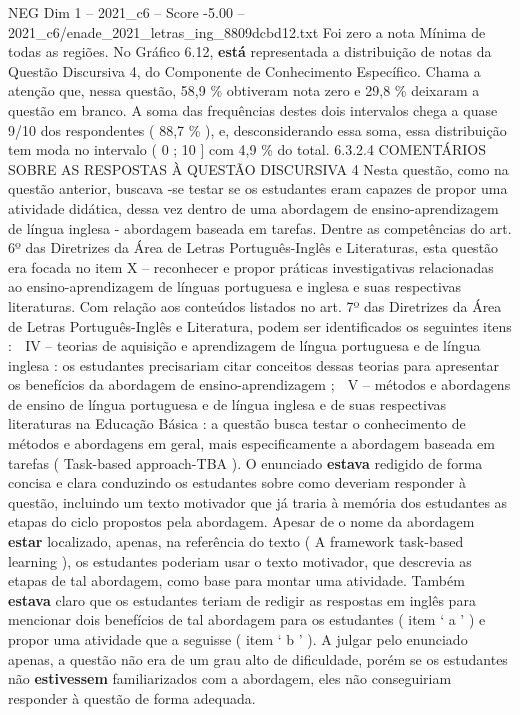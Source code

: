 \begin{textsample}{NEG Dim 1 – 2021\_c6 – Score -5.00 – 2021\_c6/enade\_2021\_letras\_ing\_8809dcbd12.txt}
Foi zero a nota Mínima de todas as regiões.
No Gráfico 6.12, \textbf{está} representada a distribuição de notas da Questão Discursiva 4, do Componente de Conhecimento Específico.
Chama a atenção que, nessa questão, 58,9 \% obtiveram nota zero e 29,8 \% deixaram a questão em branco.
A soma das frequências destes dois intervalos chega a quase 9/10 dos respondentes ( 88,7 \% ), e, desconsiderando essa soma, essa distribuição tem moda no intervalo ( 0 ; 10 ] com 4,9 \% do total. 6.3.2.4 COMENTÁRIOS SOBRE AS RESPOSTAS À QUESTÃO DISCURSIVA 4 Nesta questão, como na questão anterior, buscava -se testar se os estudantes eram capazes de propor uma atividade didática, dessa vez dentro de uma abordagem de ensino-aprendizagem de língua inglesa - abordagem baseada em tarefas.
Dentre as competências do art. 6º das Diretrizes da Área de Letras Português-Inglês e Literaturas, esta questão era focada no item X – reconhecer e propor práticas investigativas relacionadas ao ensino-aprendizagem de línguas portuguesa e inglesa e suas respectivas literaturas.
Com relação aos conteúdos listados no art. 7º das Diretrizes da Área de Letras Português-Inglês e Literatura, podem ser identificados os seguintes itens :  IV – teorias de aquisição e aprendizagem de língua portuguesa e de língua inglesa : os estudantes precisariam citar conceitos dessas teorias para apresentar os benefícios da abordagem de ensino-aprendizagem ;  V – métodos e abordagens de ensino de língua portuguesa e de língua inglesa e de suas respectivas literaturas na Educação Básica : a questão busca testar o conhecimento de métodos e abordagens em geral, mais especificamente a abordagem baseada em tarefas ( Task-based approach-TBA ).
O enunciado \textbf{estava} redigido de forma concisa e clara conduzindo os estudantes sobre como deveriam responder à questão, incluindo um texto motivador que já traria à memória dos estudantes as etapas do ciclo propostos pela abordagem.
Apesar de o nome da abordagem \textbf{estar} localizado, apenas, na referência do texto ( A framework task-based learning ), os estudantes poderiam usar o texto motivador, que descrevia as etapas de tal abordagem, como base para montar uma atividade.
Também \textbf{estava} claro que os estudantes teriam de redigir as respostas em inglês para mencionar dois benefícios de tal abordagem para os estudantes ( item ‘ a ’ ) e propor uma atividade que a seguisse ( item ‘ b ’ ).
A julgar pelo enunciado apenas, a questão não era de um grau alto de dificuldade, porém se os estudantes não \textbf{estivessem} familiarizados com a abordagem, eles não conseguiriam responder à questão de forma adequada.

\end{textsample}
